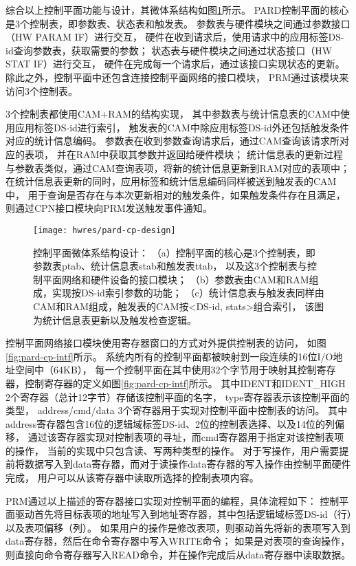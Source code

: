 综合以上控制平面功能与设计，其微体系结构如图\ref{fig:pard-cp-design}所示。
PARD控制平面的核心是3个控制表，即参数表、状态表和触发表。
参数表与硬件模块之间通过参数接口（HW PARAM IF）进行交互，
硬件在收到请求后，使用请求中的应用标签DS-id查询参数表，获取需要的参数；
状态表与硬件模块之间通过状态接口（HW STAT IF）进行交互，
硬件在完成每一个请求后，通过该接口实现状态的更新。
除此之外，控制平面中还包含连接控制平面网络的接口模块，
PRM通过该模块来访问3个控制表。

3个控制表都使用CAM+RAM的结构实现，
其中参数表与统计信息表的CAM中使用应用标签DS-id进行索引，
触发表的CAM中除应用标签DS-id外还包括触发条件对应的统计信息编码。
参数表在收到参数查询请求后，通过CAM查询该请求所对应的表项，
并在RAM中获取其参数并返回给硬件模块；
统计信息表的更新过程与参数表类似，通过CAM查询表项，将新的统计信息更新到RAM对应的表项中；
在统计信息表更新的同时，应用标签和统计信息编码同样被送到触发表的CAM中，
用于查询是否存在与本次更新相对的触发条件，如果触发条件存在且满足，
则通过CPN接口模块向PRM发送触发事件通知。

\begin{figure}[tb]
  \centering
  \texttt{[image: hwres/pard-cp-design]}
  \caption[控制平面微体系结构设计]{控制平面微体系结构设计：
  （a）控制平面的核心是3个控制表，即参数表ptab、统计信息表stab和触发表ttab，
       以及这3个控制表与控制平面网络和硬件设备的接口模块；
  （b）参数表由CAM和RAM组成，实现按DS-id索引参数的功能；
  （c）统计信息表与触发表同样由CAM和RAM组成，触发表的CAM按<DS-id, stats>组合索引，
       该图为统计信息表更新以及触发检查逻辑。}
  \label{fig:pard-cp-design}
\end{figure}

控制平面网络接口模块使用寄存器窗口的方式对外提供控制表的访问，
如图\ref{fig:pard-cp-intf}所示。
系统内所有的控制平面都被映射到一段连续的16位I/O地址空间中（64KB），
每一个控制平面在其中使用32个字节用于映射其控制寄存器，控制寄存器的定义如图\ref{fig:pard-cp-intf}所示。
其中IDENT和IDENT\_HIGH 2个寄存器（总计12字节）存储该控制平面的名字，
type寄存器表示该控制平面的类型，
address/cmd/data 3个寄存器用于实现对控制平面中控制表的访问。
其中address寄存器包含16位的逻辑域标签DS-id、2位的控制表选择、以及14位的列偏移，
通过该寄存器实现对控制表项的寻址，而cmd寄存器用于指定对该控制表项的操作，
当前的实现中只包含读、写两种类型的操作。
对于写操作，用户需要提前将数据写入到data寄存器，而对于读操作data寄存器的写入操作由控制平面硬件完成，
用户可以从该寄存器中读取所选择的控制表项内容。

PRM通过以上描述的寄存器接口实现对控制平面的编程，具体流程如下：
控制平面驱动首先将目标表项的地址写入到地址寄存器，其中包括逻辑域标签DS-id（行）以及表项偏移（列）。
如果用户的操作是修改表项，则驱动首先将新的表项写入到data寄存器，然后在命令寄存器中写入WRITE命令；
如果是对表项的查询操作，则直接向命令寄存器写入READ命令，并在操作完成后从data寄存器中读取数据。

